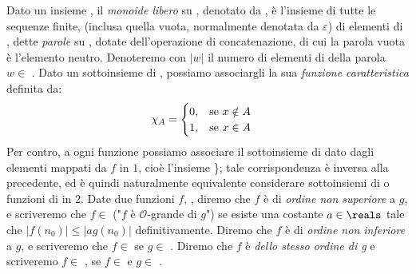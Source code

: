 Dato un insieme , il \textit{monoide libero} su , denotato da , è l'insieme di tutte le sequenze finite, (inclusa quella vuota, normalmente denotata da $\varepsilon$) di elementi di , dette \textit{parole} su , dotate dell'operazione di concatenazione, di cui la parola vuota è l'elemento neutro. Denoteremo con $|w|$ il numero di elementi di  della parola $w \in$ .
Dato un sottoinsieme  di , possiamo associargli la sua \textit{funzione caratteristica}  definita da:
\begin{equation}
    \chi_A =
    \begin{cases}
        0, \hspace{3mm} \textnormal{se } x \notin A \\
        1, \hspace{3mm} \textnormal{se } x \in A \\
    \end{cases}
\end{equation}
Per contro, a ogni funzione  possiamo associare il sottoinsieme di  dato dagli elementi mappati da $f$ in $1$, cioè l'insieme \}; tale corrispondenza è inversa alla precedente, ed è quindi naturalmente equivalente considerare sottoinsiemi di  o funzioni di  in $2$.
Date due funzioni $f$, , diremo che $f$ è di \textit{ordine non superiore} a $g$, e scriveremo che $f \in$  ("$f$ è $\mathcal{O}$-grande di $g$") se esiste una costante $a \in \reals$ tale che $|f(n_0)| \leq |a g(n_0)|$ definitivamente. Diremo che $f$ è di \textit{ordine non inferiore} a $g$, e scriveremo che $f \in$  se $g \in$ . Diremo che $f$ è \textit{dello stesso ordine di g} e scriveremo $f \in$ , se $f \in$  e $g \in$ .

